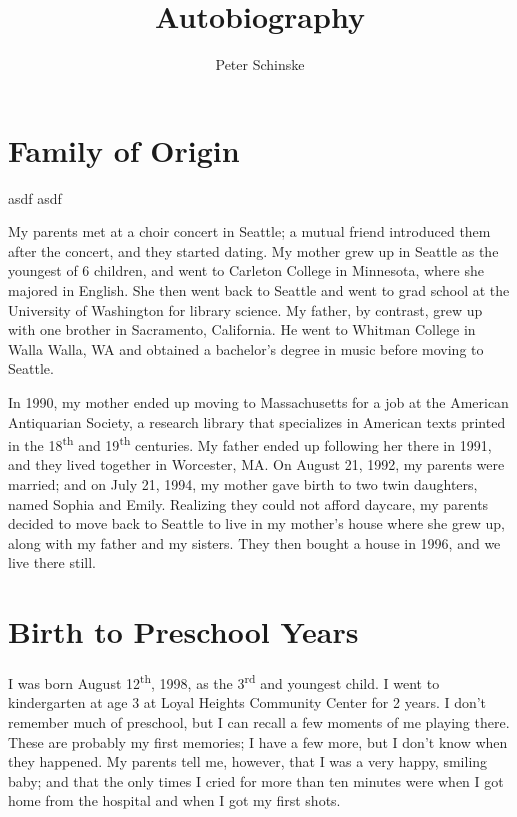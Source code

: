\documentclass[12pt, letter]{article}
\title{\textbf{Autobiography}}
\author{Peter Schinske}
\date{}
\renewcommand{\ss}[2]{#1\textsuperscript{#2}}
\begin{document}
	\singlespacing
	
	\maketitle
	
	\section*{Family of Origin}
	
	\doublespacing
	asdf
	asdf
	
	My parents met at a choir concert in Seattle; a mutual friend introduced them after the concert, and they started dating. My mother grew up in Seattle as the youngest of 6 children, and went to Carleton College in Minnesota, where she majored in English. She then went back to Seattle and went to grad school at the University of Washington for library science. My father, by contrast, grew up with one brother in Sacramento, California. He went to Whitman College in Walla Walla, WA and obtained a bachelor's degree in music before moving to Seattle.
	
	In 1990, my mother ended up moving to Massachusetts for a job at the American Antiquarian Society, a research library that specializes in American texts printed in the \ss{18}{th} and \ss{19}{th} centuries. My father ended up following her there in 1991, and they lived together in Worcester, MA. On August 21, 1992, my parents were married; and on July 21, 1994, my mother gave birth to two twin daughters, named Sophia and Emily. Realizing they could not afford daycare, my parents decided to move back to Seattle to live in my mother's house where she grew up, along with my father and my sisters. They then bought a house in 1996, and we live there still.
	
	\singlespacing
	\section*{Birth to Preschool Years}
	\doublespacing
	
	I was born August \ss{12}{th}, 1998, as the \ss{3}{rd} and youngest child. I went to kindergarten at age 3 at Loyal Heights Community Center for 2 years. I don't remember much of preschool, but I can recall a few moments of me playing there. These are probably my first memories; I have a few more, but I don't know when they happened. My parents tell me, however, that I was a very happy, smiling baby; and that the only times I cried for more than ten minutes were when I got home from the hospital and when I got my first shots.
	
\end{document}
